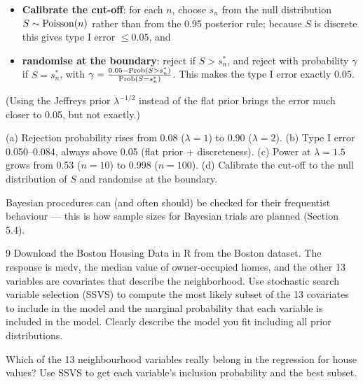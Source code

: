 \documentclass[11pt]{article}
\begin{document}
\begin{itemize}
\item \textbf{Calibrate the cut-off}: for each $n$, choose $s_n$ from the null distribution $S\sim\mathrm{Poisson}(n)$ rather than from the 0.95 posterior rule; because $S$ is discrete this gives type I error $\le0.05$, and
\item \textbf{randomise at the boundary}: reject if $S>s_n^*$, and reject with probability $\gamma$ if $S=s_n^*$, with $\gamma=\frac{0.05-\mathrm{Prob}(S>s_n^*)}{\mathrm{Prob}(S=s_n^*)}$. This makes the type I error exactly 0.05.
\end{itemize}
(Using the Jeffreys prior $\lambda^{-1/2}$ instead of the flat prior brings the error much closer to 0.05, but not exactly.)

\begin{answer}
(a) Rejection probability rises from 0.08 ($\lambda=1$) to 0.90 ($\lambda=2$). (b) Type I error 0.050--0.084, always above 0.05 (flat prior + discreteness). (c) Power at $\lambda=1.5$ grows from 0.53 ($n=10$) to 0.998 ($n=100$). (d) Calibrate the cut-off to the null distribution of $S$ and randomise at the boundary.
\end{answer}

\begin{takeaway}
Bayesian procedures can (and often should) be checked for their frequentist behaviour --- this is how sample sizes for Bayesian trials are planned (Section 5.4).
\end{takeaway}


\begin{problem}{9}
Download the Boston Housing Data in R from the Boston dataset. The response is medv, the median value of owner-occupied homes, and the other 13 variables are covariates that describe the neighborhood. Use stochastic search variable selection (SSVS) to compute the most likely subset of the 13 covariates to include in the model and the marginal probability that each variable is included in the model. Clearly describe the model you fit including all prior distributions.
\end{problem}

\begin{restate}
Which of the 13 neighbourhood variables really belong in the regression for house values? Use SSVS to get each variable's inclusion probability and the best subset.
\end{restate}
\end{document}
